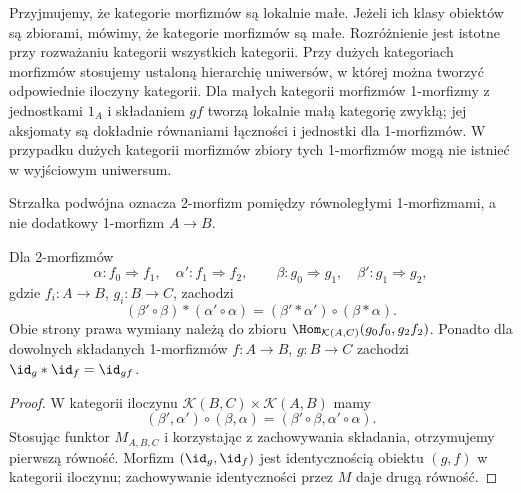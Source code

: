 Przyjmujemy, że kategorie morfizmów są lokalnie małe. Jeżeli ich klasy obiektów są zbiorami, mówimy, że kategorie morfizmów są małe. Rozróżnienie jest istotne przy rozważaniu kategorii wszystkich kategorii. Przy dużych kategoriach morfizmów stosujemy ustaloną hierarchię uniwersów, w której można tworzyć odpowiednie iloczyny kategorii. Dla małych kategorii morfizmów 1-morfizmy z jednostkami $1_A$ i składaniem $gf$ tworzą lokalnie małą kategorię zwykłą; jej aksjomaty są dokładnie równaniami łączności i jednostki dla 1-morfizmów. W przypadku dużych kategorii morfizmów zbiory tych 1-morfizmów mogą nie istnieć w wyjściowym uniwersum.

\begin{center}
\end{center}
Strzałka podwójna oznacza 2-morfizm pomiędzy równoległymi 1-morfizmami, a nie dodatkowy 1-morfizm $A\to B$.

\begin{stwierdzenie}\label{cat:prop:two-interchange}
Dla 2-morfizmów
\[
 \alpha:f_0\Rightarrow f_1,\quad \alpha':f_1\Rightarrow f_2,
 \qquad
 \beta:g_0\Rightarrow g_1,\quad \beta':g_1\Rightarrow g_2,
\]
gdzie $f_i:A\to B$, $g_i:B\to C$, zachodzi
\[
 (\beta'\circ\beta)\ast(\alpha'\circ\alpha)
 =(\beta'\ast\alpha')\circ(\beta\ast\alpha).
\]
Obie strony prawa wymiany należą do zbioru $\Hom_{\mathcal K(A,C)}(g_0f_0,g_2f_2)$. Ponadto dla dowolnych składanych 1-morfizmów $f:A\to B$, $g:B\to C$ zachodzi $\id_g\ast\id_f=\id_{gf}$.
\end{stwierdzenie}
\begin{proof}
W kategorii iloczynu $\mathcal K(B,C)\times\mathcal K(A,B)$ mamy
\[
 (\beta',\alpha')\circ(\beta,\alpha)
 =(\beta'\circ\beta,\alpha'\circ\alpha).
\]
Stosując funktor $M_{A,B,C}$ i korzystając z zachowywania składania, otrzymujemy pierwszą równość. Morfizm $(\id_g,\id_f)$ jest identycznością obiektu $(g,f)$ w kategorii iloczynu; zachowywanie identyczności przez $M$ daje drugą równość.
\end{proof}

